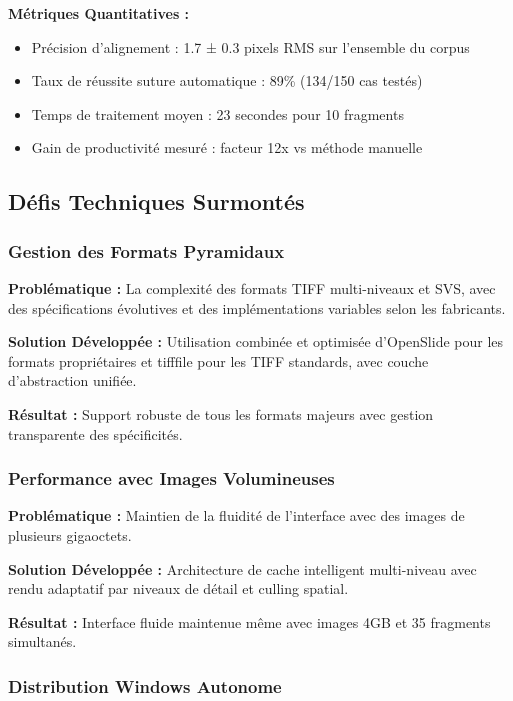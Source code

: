 \documentclass[12pt,a4paper]{article}
\begin{document}
\textbf{Métriques Quantitatives :}
\begin{itemize}
\item Précision d'alignement : 1.7 ± 0.3 pixels RMS sur l'ensemble du corpus
\item Taux de réussite suture automatique : 89\% (134/150 cas testés)
\item Temps de traitement moyen : 23 secondes pour 10 fragments
\item Gain de productivité mesuré : facteur 12x vs méthode manuelle
\end{itemize}

\subsection{Défis Techniques Surmontés}

\subsubsection{Gestion des Formats Pyramidaux}

\textbf{Problématique :} La complexité des formats TIFF multi-niveaux et SVS, avec des spécifications évolutives et des implémentations variables selon les fabricants.

\textbf{Solution Développée :} Utilisation combinée et optimisée d'OpenSlide pour les formats propriétaires et tifffile pour les TIFF standards, avec couche d'abstraction unifiée.

\textbf{Résultat :} Support robuste de tous les formats majeurs avec gestion transparente des spécificités.

\subsubsection{Performance avec Images Volumineuses}

\textbf{Problématique :} Maintien de la fluidité de l'interface avec des images de plusieurs gigaoctets.

\textbf{Solution Développée :} Architecture de cache intelligent multi-niveau avec rendu adaptatif par niveaux de détail et culling spatial.

\textbf{Résultat :} Interface fluide maintenue même avec images 4GB et 35 fragments simultanés.

\subsubsection{Distribution Windows Autonome}
\end{document}
